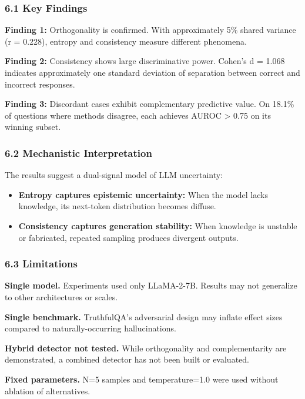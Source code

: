 
\subsubsection{6.1 Key Findings}

\textbf{Finding 1:} Orthogonality is confirmed. With approximately 5\% shared variance (r = 0.228), entropy and consistency measure different phenomena.

\textbf{Finding 2:} Consistency shows large discriminative power. Cohen's d = 1.068 indicates approximately one standard deviation of separation between correct and incorrect responses.

\textbf{Finding 3:} Discordant cases exhibit complementary predictive value. On 18.1\% of questions where methods disagree, each achieves AUROC > 0.75 on its winning subset.

\subsubsection{6.2 Mechanistic Interpretation}

The results suggest a dual-signal model of LLM uncertainty:

\begin{itemize}
\item \textbf{Entropy captures epistemic uncertainty:} When the model lacks knowledge, its next-token distribution becomes diffuse.
\item \textbf{Consistency captures generation stability:} When knowledge is unstable or fabricated, repeated sampling produces divergent outputs.
\end{itemize}

\subsubsection{6.3 Limitations}

\textbf{Single model.} Experiments used only LLaMA-2-7B. Results may not generalize to other architectures or scales.

\textbf{Single benchmark.} TruthfulQA's adversarial design may inflate effect sizes compared to naturally-occurring hallucinations.

\textbf{Hybrid detector not tested.} While orthogonality and complementarity are demonstrated, a combined detector has not been built or evaluated.

\textbf{Fixed parameters.} N=5 samples and temperature=1.0 were used without ablation of alternatives.

